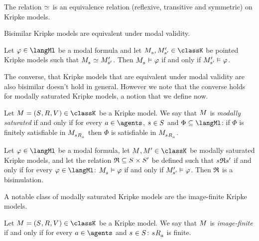 \begin{proposition}
The relation $\bisimilar$ is an equivalence relation (reflexive, transitive and symmetric) on Kripke models.
\end{proposition}

Bisimilar Kripke models are equivalent under modal validity.

\begin{proposition}
Let $\phi \in \langMl$ be a modal formula and 
let $\pointedModel{\stateS}, \pointedModel[\prime]{\stateS[\prime]} \in \classK$ be pointed Kripke models such that $\pointedModel{\stateS} \bisimilar \pointedModel[\prime]{\stateS[\prime]}$.
Then $\pointedModel{\stateS} \entails \phi$ if and only if $\pointedModel[\prime]{\stateS[\prime]} \entails \phi$.
\end{proposition}

The converse, that Kripke models that are equivalent under modal validity are also bisimilar doesn't hold in general.
However we note that the converse holds for modally saturated Kripke models, a notion that we define now.

\begin{definition}
Let $\modelAndTuple \in \classK$ be a Kripke model.
We say that $\model$ is {\em modally saturated} if and only if for every $\agentA \in \agents$, $\stateS \in \states$ and $\Phi \subseteq \langMl$: if $\Phi$ is finitely satisfiable in $\pointedModel{\successors{\agentA}{\stateS}}$ then $\Phi$ is satisfiable in $\pointedModel{\successors{\agentA}{\stateS}}$.
\end{definition}

\begin{proposition}
Let $\phi \in \langMl$ be a modal formula,
let $\model, \model[\prime] \in \classK$ be modally saturated Kripke models, and
let the relation $\bisimulation \subseteq \states \times \states[\prime]$ be defined such that $\stateS \bisimulation \stateS[\prime]$ if and only if for every $\phi \in \langMl$: $\pointedModel{\stateS} \entails \phi$ if and only if $\pointedModel[\prime]{\stateS[\prime]} \entails \phi$.
Then $\bisimulation$ is a bisimulation.
\end{proposition}

A notable class of modally saturated Kripke models are the image-finite Kripke models.

\begin{definition}
Let $\modelAndTuple \in \classK$ be a Kripke model.
We say that $\model$ is {\em image-finite} if and only if for every $\agentA \in \agents$ and $\stateS \in \states$: $\successors{\agentA}{\stateS}$ is finite.
\end{definition}

